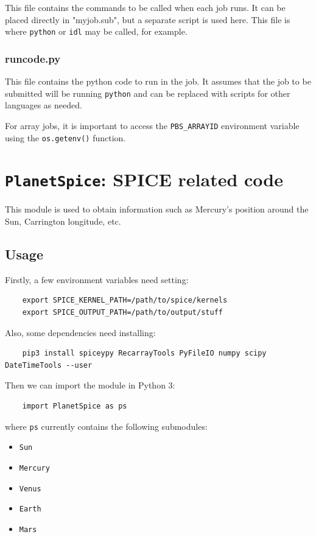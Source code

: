 	This file contains the commands to be called when each job runs. It can be placed directly in "myjob.sub", but a separate script is used here. This file is where \texttt{python} or \texttt{idl} may be called, for example.
	
	\subsubsection{runcode.py}
	
	This file contains the python code to run in the job. It assumes that the job to be submitted will be running \texttt{python} and can be replaced with scripts for other languages as needed.
	
	For array jobs, it is important to access the \texttt{PBS\_ARRAYID} environment variable using the \texttt{os.getenv()} function.
	

	\section{\texttt{PlanetSpice}: SPICE related code}


	This module is used to obtain information such as Mercury's position around the Sun, Carrington longitude, etc.
	
	\subsection{Usage}
	
	Firstly, a few environment variables need setting:
	
	\begin{verbatim}
	export SPICE_KERNEL_PATH=/path/to/spice/kernels
	export SPICE_OUTPUT_PATH=/path/to/output/stuff
	\end{verbatim}
	
	Also, some dependencies need installing:
	
	\begin{verbatim}
	pip3 install spiceypy RecarrayTools PyFileIO numpy scipy DateTimeTools --user
	\end{verbatim}
	
	Then we can import the module in Python 3:
	
	\begin{verbatim}
	import PlanetSpice as ps
	\end{verbatim}
	
	where \texttt{ps} currently contains the following submodules:
	
	\begin{itemize}
	  \item \texttt{Sun}
	  \item \texttt{Mercury}
	  \item \texttt{Venus}
	  \item \texttt{Earth}
	  \item \texttt{Mars}
	\end{itemize}
	


